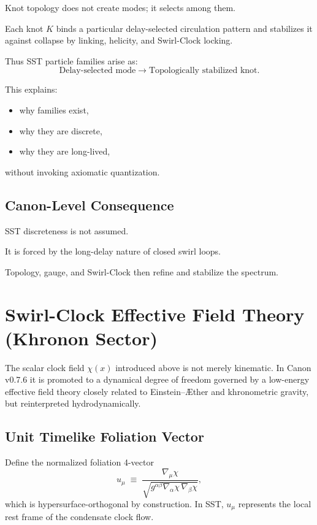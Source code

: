 \documentclass[10pt]{article}
\begin{document}
Knot topology does not create modes; it selects among them.

Each knot $K$ binds a particular delay-selected circulation pattern and stabilizes it against collapse by linking, helicity, and Swirl-Clock locking.

Thus SST particle families arise as:
\begin{equation}
    \text{Delay-selected mode} \longrightarrow \text{Topologically stabilized knot}.
\end{equation}

This explains:
\begin{itemize}
    \item why families exist,
    \item why they are discrete,
    \item why they are long-lived,
\end{itemize}
without invoking axiomatic quantization.

\subsection{Canon-Level Consequence}

SST discreteness is not assumed.

It is forced by the long-delay nature of closed swirl loops.

Topology, gauge, and Swirl-Clock then refine and stabilize the spectrum.

    \section{Swirl-Clock Effective Field Theory (Khronon Sector)}
    \label{sec:clockEFT}

The scalar clock field $\chi(x)$ introduced above is not merely kinematic.
In Canon v0.7.6 it is promoted to a dynamical degree of freedom governed by
a low-energy effective field theory closely related to Einstein--\AE ther
and khronometric gravity, but reinterpreted hydrodynamically.

\subsection{Unit Timelike Foliation Vector}

Define the normalized foliation 4-vector
\begin{equation}
    u_\mu
    \;\equiv\;
    \frac{\nabla_\mu \chi}
    {\sqrt{g^{\alpha\beta}\nabla_\alpha\chi\,\nabla_\beta\chi}},
\end{equation}
which is hypersurface-orthogonal by construction. In SST, $u_\mu$ represents
the local rest frame of the condensate clock flow.
\end{document}
